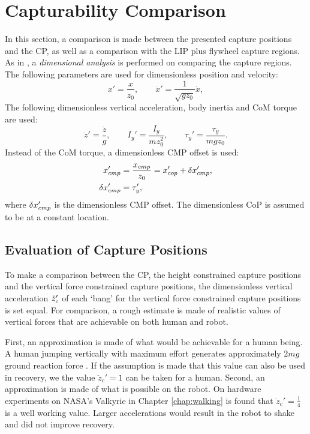 \section{Capturability Comparison}
In this section, a comparison is made between the presented capture positions and the \ac{CP}, as well as a comparison with the \ac{LIP} plus flywheel capture regions. As in \cite{pratt2006capture, stephens2007humanoid, koolen2012capturability}, a \textit{dimensional analysis} is performed on comparing the capture regions. The following parameters are used for dimensionless position and velocity:
\begin{equation}
	x' = \frac{x}{z_0}, \qquad \dot{x}' = \frac{1}{\sqrt{gz_0}}\dot{x},
\end{equation}
The following dimensionless vertical acceleration, body inertia and \ac{CoM} torque are used:
\begin{equation}
 \ddot{z}'=\frac{\ddot{z}}{g}, \qquad I_y'=\frac{I_y}{mz_0^2}, \qquad \tau_y' = \frac{\tau_y}{mgz_0}.
\end{equation}
Instead of the \ac{CoM} torque, a dimensionless \ac{CMP} offset is used:
\begin{align}
	x_{cmp}' &=\frac{x_{cmp}}{z_0}=x_{cop}' + \delta x_{cmp}',\\
	\delta x_{cmp}' &=\tau_y',
\end{align}
where $\delta x_{cmp}'$ is the dimensionless \ac{CMP} offset. The dimensionless \ac{CoP} is assumed to be at a constant location.

\subsection{Evaluation of Capture Positions}\label{sec:capcomparenoinertia}
To make a comparison between the \ac{CP}, the height constrained capture positions and the vertical force constrained capture positions, the dimensionless vertical acceleration $\ddot{z}_{c}'$ of each `bang' for the vertical force constrained capture positions is set equal. For comparison, a rough estimate is made of realistic values of vertical forces that are achievable on both human and robot.

First, an approximation is made of what would be achievable for a human being. A human jumping vertically with maximum effort generates approximately $2mg$ ground reaction force \cite{linthorne2001analysis}. If the assumption is made that this value can also be used in recovery, we the value $\ddot{z}_c'=1$ can be taken for a human. Second, an approximation is made of what is possible on the robot. On hardware experiments on NASA's Valkyrie in Chapter \ref{chap:walking} is found that $\ddot{z}_c'=\frac{1}{4}$ is a well working value. Larger accelerations would result in the robot to shake and did not improve recovery. 

